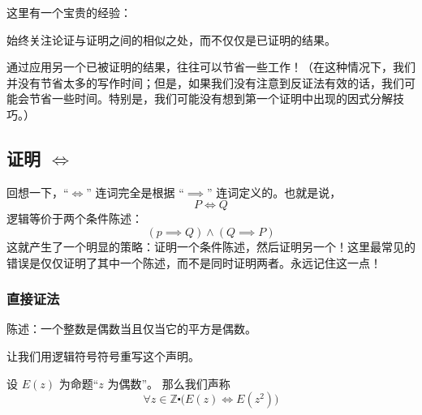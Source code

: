 这里有一个宝贵的经验：

\begin{center}
    始终关注论证与证明之间的相似之处，而不仅仅是已证明的结果。
\end{center}

通过应用另一个已被证明的结果，往往可以节省一些工作！（在这种情况下，我们并没有节省太多的写作时间；但是，如果我们没有注意到反证法有效的话，我们可能会节省一些时间。特别是，我们可能没有想到第一个证明中出现的因式分解技巧。）

\subsection{证明 $\iff$}\label{sec:section4.9.6}

回想一下，``$\iff$'' 连词完全是根据 ``$\implies$'' 连词定义的。也就是说，
\[P \iff Q\]
逻辑等价于两个条件陈述：
\[(p \implies Q) \land (Q \implies P)\]
这就产生了一个明显的策略：证明一个条件陈述，然后证明另一个！这里最常见的错误是仅仅证明了其中一个陈述，而不是同时证明两者。永远记住这一点！

\subsubsection*{直接证法}

\begin{center}
    \noindent {}
\end{center}

\newpage

\begin{example}[偶数的平方为偶数]

    陈述：一个整数是偶数当且仅当它的平方是偶数。

    让我们用逻辑符号符号重写这个声明。
    
    设 $E(z)$ 为命题``$z$ 为偶数''。 那么我们声称
    \[\forall z \in \mathbb{Z} \centerdot \Big(E(z) \iff E(z^2)\Big)\]
\end{example}

